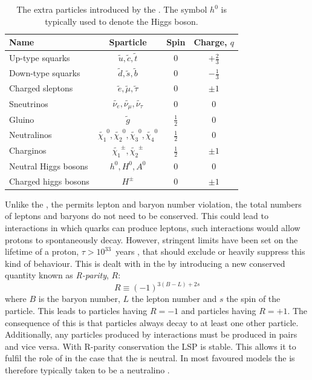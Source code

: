 \begin{table}
\begin{tabular}{|l|c|c|c|}
Name & Sparticle & Spin & Charge, $q$ \\
\hline
Up-type squarks & $\tilde{u},\tilde{c},\tilde{t}$ & 0 & $+\frac{2}{3}$ \\
Down-type squarks & $\tilde{d},\tilde{s},\tilde{b}$ & 0 & $-\frac{1}{3}$ \\
Charged sleptons & $\tilde{e},\tilde{\mu},\tilde{\tau}$ & 0 & $\pm1$ \\
Sneutrinos & $\tilde{\nu_{e}},\tilde{\nu_{\mu}},\tilde{\nu_{\tau}}$ & 0 & 0 \\
\hline
Gluino & $\tilde{g}$ & $\frac{1}{2}$ & 0 \\
Neutralinos &
$\tilde{\chi_{1}}^0,\tilde{\chi_{2}}^0,\tilde{\chi_{3}}^0,\tilde{\chi_{4}}^0$
& $\frac{1}{2}$ & 0  \\
Charginos & $\tilde{\chi_{1}}^{\pm},\tilde{\chi_{2}}^{\pm}$ &
$\frac{1}{2}$ & $\pm1$ \\
\hline
Neutral Higgs bosons & $h^0,H^0,A^0$ & 0 & 0 \\
Charged higgs bosons & $H^{\pm}$ & 0 & $\pm1$ \\
\end{tabular}
\caption{The extra particles introduced by the \MSSM. The symbol $h^0$
is typically used to denote the \SM Higgs boson.
\cite{Martin:1997ns}}
\label{tab:susy}
\end{table}

Unlike the \SM, the \MSSM permits lepton and baryon number violation,
the total numbers of leptons and baryons do not need to be conserved.
This could lead to interactions in which quarks can produce leptons,
such interactions would allow protons to spontaneously decay.
However, stringent limits have been set on the lifetime of a proton,
$\tau>10^{33}$~years \cite{PhysRevD.95.012004}, that should exclude or heavily suppress this
kind of behaviour. This is dealt with in the \MSSM by introducing a
new conserved quantity known as \emph{R-parity}, $R$:
\begin{equation}
R\equiv (-1)^{3(B-L)+2s}
\end{equation}
where $B$ is the baryon number, $L$ the lepton number and $s$ the spin
of the particle. This leads to \SUSY particles having $R=-1$ and \SM
particles having $R=+1$. The consequence of this is that \SUSY particles
always decay to at least one other \SUSY particle. Additionally, any
\SUSY particles produced by \SM interactions must be produced in
pairs and vice versa. With R-parity conservation the \acf{LSP} is
stable. This allows it to fulfil the role of \DM in the case that
the \LSP is neutral. In most favoured \SUSY models the \LSP is
therefore typically taken to be a neutralino \cite{Farrar:1978xj}.

